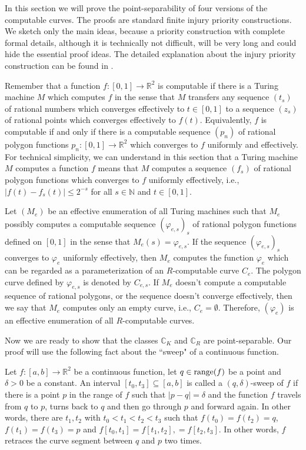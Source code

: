 \documentclass{LMCS}
\theoremstyle{plain}
\def\IC{\mathbb{C}}
\def\IN{\mathbb{N}}
\def\IR{\mathbb{R}}
\newcommand{\rang}{\mbox{\rm range}}
\begin{document}
In this section we will prove the point-separability of four versions of the computable curves. The proofs are standard finite injury priority constructions. We sketch only the main ideas, because a priority construction with complete formal details, although it is technically not difficult, will be very long and could hide the essential proof ideas. The detailed explanation about the injury priority construction can be found in \cite{Soa87}.

Remember that a function $f:[0,1] \to \IR^2$ is computable if there is a Turing machine $M$ which computes $f$ in the sense that $M$ transfers any sequence $(t_s)$ of rational numbers which converges effectively to $t\in [0,1]$ to a sequence $(z_s)$ of rational points which converges effectively to $f(t)$. Equivalently, $f$ is computable if and only if there is a computable sequence $(p_n)$ of rational polygon functions $p_n:[0,1] \to \IR^2$ which converges to $f$ uniformly and effectively. For technical simplicity, we can understand in this section that a Turing machine $M$ computes a function $f$ means that $M$ computes a sequence $(f_s)$ of rational polygon functions which converges to $f$ uniformly effectively, i.e., $|f(t) -f_s(t)| \le 2^{-s}$ for all $s\in\IN$ and $t\in [0,1]$.

Let $(M_e)$ be an effective enumeration of all Turing machines such that $M_e$ possibly computes a computable sequence $(\varphi_{e,s})_s$ of rational polygon functions defined on $[0,1]$ in the sense that $M_e(s) = \varphi_{e,s}$. If the sequence $(\varphi_{e,s})_s$ converges to $\varphi_e$ uniformly effectively, then $M_e$ computes the function $\varphi_e$ which can be regarded as a parameterization of an $R$-computable curve $C_e$. The polygon curve defined by $\varphi_{e,s}$ is denoted by $C_{e,s}$. If $M_e$ doesn't compute a computable sequence of rational polygons, or the sequence doesn't converge effectively, then we say that $M_e$  computes only an empty curve, i.e., $C_e =\emptyset$. Therefore, $(\varphi_e)$ is an effective enumeration of all $R$-computable curves.

Now we are ready to show that the classes $\IC_K$ and $\IC_R$ are point-separable. Our proof will use the following fact about the ``sweep" of a continuous function.

Let $f:[a,b]\to \IR^2$ be a continuous function, let $q\in \rang(f)$ be a point and $\delta >0$ be a constant. An interval $[t_0, t_3]\subseteq [a,b]$ is called a $(q, \delta)$-sweep of $f$ if there is a point $p$ in the range of $f$ such that  $|p-q| =\delta$ and the function $f$ travels from $q$ to $p$, turns back to $q$ and then go through $p$ and forward again. In other words, there are $t_1, t_2$ with $t_0<t_1<t_2<t_3$  such that $f(t_0) =f(t_2) =q$, $f(t_1) =f(t_3)=p$ and $f[t_0,t_1] =f[t_1, t_2], = f[t_2, t_3]$.  In other words, $f$ retraces the curve segment between $q$ and $p$ two times.
\end{document}
